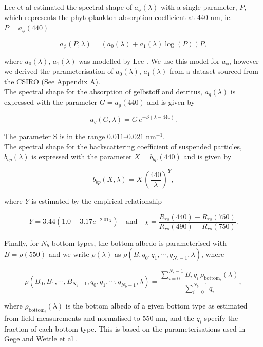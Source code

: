 \documentclass[12pt]{article}
\numberwithin{equation}{section}
\begin{document}
Lee et al estimated the spectral shape of $a_{\phi}(\lambda)$ with a single parameter, $P$, which 
represents the phytoplankton absorption coefficient at 440 nm, ie. $P = a_{\phi}(440)$ 
\begin{linenomath}
\begin{equation}
a_{\phi}(P,\lambda) = \left(a_0(\lambda) + a_1(\lambda)\log(P)\right)P,\label{a_phi}
\end{equation}
\end{linenomath}
where $a_0(\lambda)$, $a_1(\lambda)$ was modelled by Lee \cite{lee1994}. We use this model for $a_{\phi}$, 
however we derived the parameterisation of $a_0(\lambda)$, $a_1(\lambda)$ from a dataset sourced 
from the CSIRO \cite{csiro2005} (See Appendix A). \\

The spectral shape for the absorption of gelbstoff and detritus, $a_g(\lambda)$ is 
expressed with the parameter $G = a_g(440)$ and is given by
\begin{linenomath}
\begin{equation*}
a_g(G,\lambda) = G\, e^{-S(\lambda - 440)}.
\end{equation*}
\end{linenomath}

The parameter S is in the range $0.011$--$0.021$ $\text{nm}^{-1}$. \\

The spectral shape for the backscattering coefficient of suspended particles, 
$b_{bp}(\lambda)$ is expressed with the parameter $X = b_{bp}(440)$ and is given by
\begin{linenomath}
\begin{equation*}
b_{bp}(X,\lambda) = X\, \left(\frac{440}{\lambda}\right)^Y,
\end{equation*}
\end{linenomath}
where $Y$ is estimated by the empirical relationship 
\begin{linenomath}
\begin{equation*}
Y = 3.44 \left( 1.0 - 3.17 e^{-2.01 \chi} \right) \quad \text{and} \quad \chi = \frac{R_{rs}(440) - R_{rs}(750)}{R_{rs}(490) - R_{rs}(750)}.
\end{equation*}
\end{linenomath}

Finally, for $N_b$ bottom types, the bottom albedo is parameterised with 
$B = \rho(550)$ and we write $\rho(\lambda)$ as $\rho(B, q_0, q_1, \cdots, q_{N_b-1}, \lambda)$, where 
\begin{linenomath}
\begin{equation}
\rho(B_0, B_1, \cdots, B_{N_b-1}, q_0, q_1, \cdots, q_{N_b-1}, \lambda) = \frac{\sum\limits_{i=0}^{N_b-1}B_i\,q_i\,\rho_{\text{bottom}_i}(\lambda)}{\sum\limits_{i=0}^{N_b-1}q_i},\label{bottom_formulation}
\end{equation}
\end{linenomath}
where $\rho_{\text{bottom}_i}(\lambda)$ is the bottom albedo of a given bottom type as 
estimated from field measurements and normalised to 550 nm, and the $q_i$ specify the fraction 
of each bottom type. This is based on the parameterisations used in Gege \cite{gege2004} and 
Wettle et al \cite{wettle2006}. \\
\end{document}
